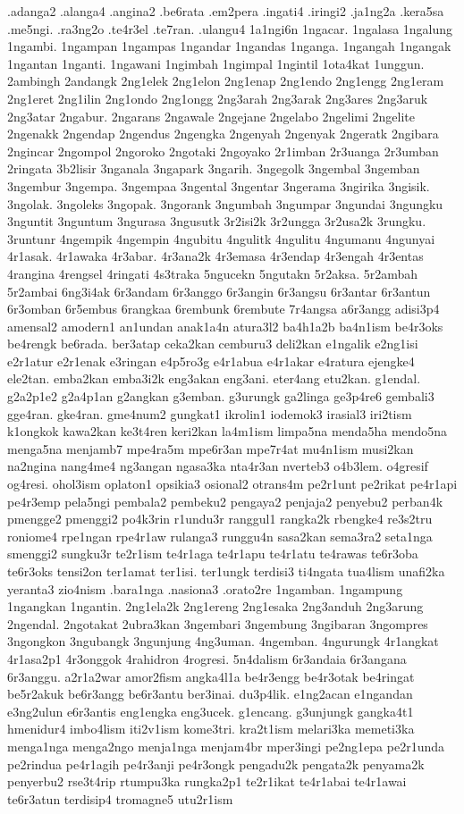 {.adanga2 .alanga4 .angina2 .be6rata .em2pera .ingati4 .iringi2 .ja1ng2a .kera5sa .me5ngi. .ra3ng2o .te4r3el .te7ran. .ulangu4 1a1ngi6n 1ngacar. 1ngalasa 1ngalung 1ngambi. 1ngampan 1ngampas 1ngandar 1ngandas 1nganga. 1ngangah 1ngangak 1ngantan 1nganti. 1ngawani 1ngimbah 1ngimpal 1ngintil 1ota4kat 1unggun. 2ambingh 2andangk 2ng1elek 2ng1elon 2ng1enap 2ng1endo 2ng1engg 2ng1eram 2ng1eret 2ng1ilin 2ng1ondo 2ng1ongg 2ng3arah 2ng3arak 2ng3ares 2ng3aruk 2ng3atar 2ngabur. 2ngarans 2ngawale 2ngejane 2ngelabo 2ngelimi 2ngelite 2ngenakk 2ngendap 2ngendus 2ngengka 2ngenyah 2ngenyak 2ngeratk 2ngibara 2ngincar 2ngompol 2ngoroko 2ngotaki 2ngoyako 2r1imban 2r3uanga 2r3umban 2ringata 3b2lisir 3nganala 3ngapark 3ngarih. 3ngegolk 3ngembal 3ngemban 3ngembur 3ngempa. 3ngempaa 3ngental 3ngentar 3ngerama 3ngirika 3ngisik. 3ngolak. 3ngoleks 3ngopak. 3ngorank 3ngumbah 3ngumpar 3ngundai 3ngungku 3nguntit 3nguntum 3ngurasa 3ngusutk 3r2isi2k 3r2ungga 3r2usa2k 3rungku. 3runtunr 4ngempik 4ngempin 4ngubitu 4ngulitk 4ngulitu 4ngumanu 4ngunyai 4r1asak. 4r1awaka 4r3abar. 4r3ana2k 4r3emasa 4r3endap 4r3engah 4r3entas 4rangina 4rengsel 4ringati 4s3traka 5ngucekn 5ngutakn 5r2aksa. 5r2ambah 5r2ambai 6ng3i4ak 6r3andam 6r3anggo 6r3angin 6r3angsu 6r3antar 6r3antun 6r3omban 6r5embus 6rangkaa 6rembunk 6rembute 7r4angsa a6r3angg adisi3p4 amensal2 amodern1 an1undan anak1a4n atura3l2 ba4h1a2b ba4n1ism be4r3oks be4rengk be6rada. ber3atap ceka2kan cemburu3 deli2kan e1ngalik e2ng1isi e2r1atur e2r1enak e3ringan e4p5ro3g e4r1abua e4r1akar e4ratura ejengke4 ele2tan. emba2kan emba3i2k eng3akan eng3ani. eter4ang etu2kan. g1endal. g2a2p1e2 g2a4p1an g2angkan g3emban. g3urungk ga2linga ge3p4re6 gembali3 gge4ran. gke4ran. gme4num2 gungkat1 ikrolin1 iodemok3 irasial3 iri2tism k1ongkok kawa2kan ke3t4ren keri2kan la4m1ism limpa5na menda5ha mendo5na menga5na menjamb7 mpe4ra5m mpe6r3an mpe7r4at mu4n1ism musi2kan na2ngina nang4me4 ng3angan ngasa3ka nta4r3an nverteb3 o4b3lem. o4gresif og4resi. ohol3ism oplaton1 opsikia3 osional2 otrans4m pe2r1unt pe2rikat pe4r1api pe4r3emp pela5ngi pembala2 pembeku2 pengaya2 penjaja2 penyebu2 perban4k pmengge2 pmenggi2 po4k3rin r1undu3r ranggul1 rangka2k rbengke4 re3s2tru roniome4 rpe1ngan rpe4r1aw rulanga3 runggu4n sasa2kan sema3ra2 seta1nga smenggi2 sungku3r te2r1ism te4r1aga te4r1apu te4r1atu te4rawas te6r3oba te6r3oks tensi2on ter1amat ter1isi. ter1ungk terdisi3 ti4ngata tua4lism unafi2ka yeranta3 zio4nism
.bara1nga .nasiona3 .orato2re 1ngamban. 1ngampung 1ngangkan 1ngantin. 2ng1ela2k 2ng1ereng 2ng1esaka 2ng3anduh 2ng3arung 2ngendal. 2ngotakat 2ubra3kan 3ngembari 3ngembung 3ngibaran 3ngompres 3ngongkon 3ngubangk 3ngunjung 4ng3uman. 4ngemban. 4ngurungk 4r1angkat 4r1asa2p1 4r3onggok 4rahidron 4rogresi. 5n4dalism 6r3andaia 6r3angana 6r3anggu. a2r1a2war amor2fism angka4l1a be4r3engg be4r3otak be4ringat be5r2akuk be6r3angg be6r3antu ber3inai. du3p4lik. e1ng2acan e1ngandan e3ng2ulun e6r3antis eng1engka eng3ucek. g1encang. g3unjungk gangka4t1 hmenidur4 imbo4lism iti2v1ism kome3tri. kra2t1ism melari3ka memeti3ka menga1nga menga2ngo menja1nga menjam4br mper3ingi pe2ng1epa pe2r1unda pe2rindua pe4r1agih pe4r3anji pe4r3ongk pengadu2k pengata2k penyama2k penyerbu2 rse3t4rip rtumpu3ka rungka2p1 te2r1ikat te4r1abai te4r1awai te6r3atun terdisip4 tromagne5 utu2r1ism
}
